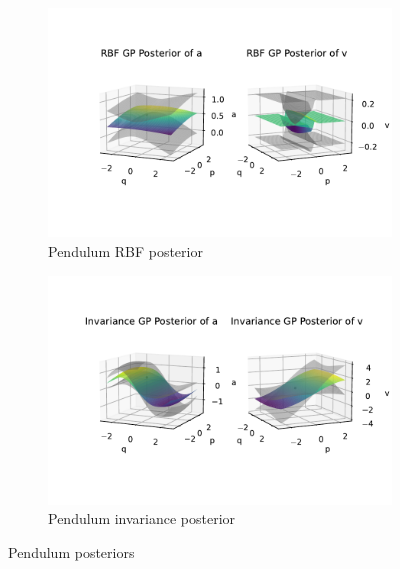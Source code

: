\documentclass{statsmsc}
\begin{document}
\begin{figure}[H]
     \centering
     \begin{subfigure}[b]{\linewidth}
        \centering
        \includegraphics[width=\linewidth]{../codes/figures/posterior_pendulum_rbf.pdf}
        \caption{Pendulum RBF posterior}
        \label{fig:posterior_pendulum_rbf}
     \end{subfigure}
     \hfill
     \begin{subfigure}[b]{\linewidth}
         \centering
         \includegraphics[width=\linewidth]{../codes/figures/posterior_pendulum_invariance.pdf}
         \caption{Pendulum invariance posterior}
         \label{fig:posterior_pendulum_invariance}
     \end{subfigure}
        \caption{Pendulum posteriors}
        \label{fig:posterior_pendulum}
\end{figure}
\end{document}
